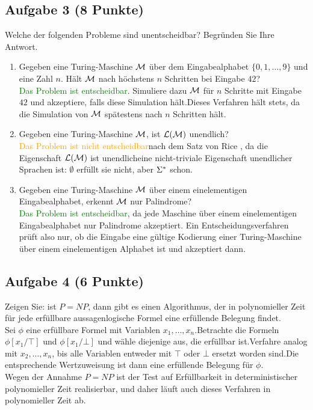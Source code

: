 \subsection*{Aufgabe 3 (8 Punkte)}
    Welche der folgenden Probleme sind unentscheidbar? Begründen Sie Ihre Antwort.
    \begin{enumerate}
        \item Gegeben eine Turing-Maschine $\mathcal{M}$ über dem Eingabealphabet $\{0,1,\dots,9\}$ und eine Zahl $n$. Hält $\mathcal{M}$ nach höchstens $n$ Schritten bei Eingabe $42$? \\
        \LOES \textcolor{green}{Das Problem ist entscheidbar}\POINT. Simuliere dazu $\mathcal{M}$ für $n$ Schritte mit Eingabe $42$ und akzeptiere, falls diese Simulation hält.\POINT Dieses Verfahren hält stets, da die Simulation von $\mathcal{M}$ spätestens nach $n$ Schritten hält.\POINT

        \item Gegeben eine Turing-Maschine $\mathcal{M}$, ist $\mathcal{L}(\mathcal{M})$ unendlich? \\
        \LOES \textcolor{orange}{Das Problem ist nicht entscheidbar}\POINT nach dem Satz von Rice \POINT, da die Eigenschaft \glqq $\mathcal{L}(\mathcal{M})$ ist unendlich\grqq eine nicht-triviale Eigenschaft unendlicher Sprachen ist: $\emptyset$ erfüllt sie nicht, aber $\Sigma^{*}$ schon.\POINT

        \item Gegeben eine Turing-Maschine $\mathcal{M}$ über einem einelementigen Eingabealphabet, erkennt $\mathcal{M}$ nur Palindrome? \\
        \LOES \textcolor{green}{Das Problem ist entscheidbar}\POINT, da jede Maschine über einem einelementigen Eingabealphabet nur Palindrome akzeptiert. Ein Entscheidungsverfahren prüft also nur, ob die Eingabe eine gültige Kodierung einer Turing-Maschine über einem einelementigen Alphabet ist und akzeptiert dann.\POINT
    \end{enumerate}


\subsection*{Aufgabe 4 (6 Punkte)}
    Zeigen Sie: ist $P = NP$, dann gibt es einen Algorithmus, der in polynomieller Zeit für jede erfüllbare aussagenlogische Formel eine erfüllende Belegung findet. \\

    \LOES Sei $\phi$ eine erfüllbare Formel mit Variablen $x_1,\dots,x_n$.\POINT Betrachte die Formeln $\phi[x_1/\top]$ und $\phi[x_1/\bot]$ und wähle diejenige aus, die erfüllbar ist.\POINT Verfahre analog mit $x_2,\dots,x_n$, bis alle Variablen entweder mit $\top$ oder $\bot$ ersetzt worden sind.\POINT Die entsprechende Wertzuweisung ist dann eine erfüllende Belegung für $\phi$.\POINT \\
    Wegen der Annahme $P = NP$ ist der Test auf Erfüllbarkeit in deterministischer polynomieller Zeit realisierbar\POINT, und daher läuft auch dieses Verfahren in polynomieller Zeit ab.\POINT


